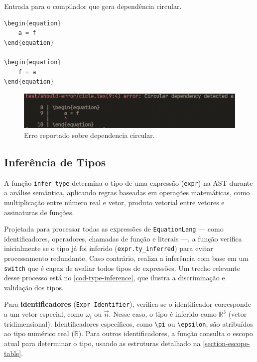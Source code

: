 \begin{codigo}[H]
    \caption{\small Entrada para o compilador que gera dependência circular.}
    \label{cod-grafo-simbol-deps}
\begin{lstlisting}[language=C, numbers=none, frame=none, inputencoding=latin1]
\begin{equation}
    a = f
\end{equation}

\begin{equation}
    f = a
\end{equation}

\end{lstlisting}
\end{codigo}

\begin{figure}[H]
    \caption{\label{label} \small Erro reportado sobre dependencia circular.}
    \begin{center}
        \includegraphics[scale=0.5]{./Imagens/error-circular-deps.png}
    \end{center}
\end{figure}


\subsection{Inferência de Tipos} \label{subsection-type-inference}


A função \verb`infer_type` determina o tipo de uma expressão (\verb`expr`) na AST durante a análise semântica, aplicando regras baseadas em operações matemáticas, como multiplicação entre número real e vetor, produto vetorial entre vetores e assinaturas de funções. 

Projetada para processar todas as expressões de \texttt{EquationLang} — como identificadores, operadores, chamadas de função e literais —, a função verifica inicialmente se o tipo já foi inferido (\verb"expr.ty_inferred") para evitar processamento redundante. Caso contrário, realiza a inferência com base em um \verb"switch" que é capaz de avaliar todos tipos de expressões. Um trecho relevante desse processo está no \autoref{cod-type-inference}, que ilustra a discriminação e validação dos tipos.

Para \textbf{identificadores} (\verb"Expr_Identifier"), verifica se o identificador corresponde a um vetor especial, como $\omega_i$ ou $\vec{n}$. Nesse caso, o tipo é inferido como $\mathbb{R}^3$ (vetor tridimensional). Identificadores específicos, como \verb"\pi" ou \verb"\epsilon", são atribuídos ao tipo numérico real ($\mathbb{R}$). Para outros identificadores, a função consulta o escopo atual para determinar o tipo, usando as estruturas detalhado na \autoref{section-escope-table}.

